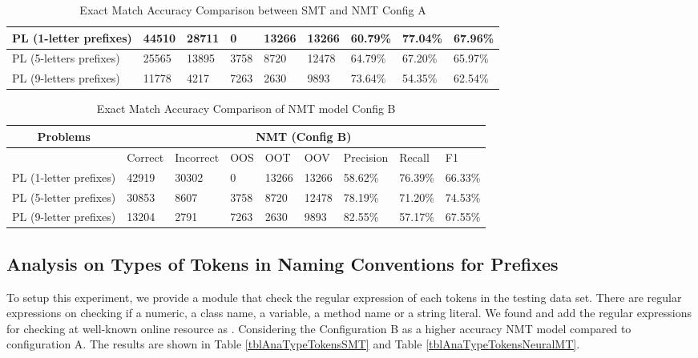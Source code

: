 \begin{table*}[]
\begin{tabular}{|l|l|l|l|l|l|l|l|l|}
PL (1-letter prefixes)  & 44510            & 28711              & 0            & 13266        & 13266        & 60.79\%            & 77.04\%         & 67.96\%     \\ \hline
PL (5-letters prefixes) & 25565            & 13895              & 3758         & 8720         & 12478        & 64.79\%            & 67.20\%         & 65.97\%     \\ \hline
PL (9-letters prefixes) & 11778            & 4217               & 7263         & 2630         & 9893         & 73.64\%            & 54.35\%         & 62.54\%     \\ \hline
\end{tabular}
\caption{Exact Match Accuracy Comparison between SMT and NMT Config A}
\label{tblExactMatchAccuracySMTAndNMT}
\end{table*}


\begin{table*}[]
\small
\begin{tabular}{|l|l|l|l|l|l|l|l|l|}
\hline
\multicolumn{1}{|c|}{\textbf{Problems}}             & \multicolumn{8}{c|}{\textbf{NMT (Config B)}}                               \\ \hline
                                                    & Correct & Incorrect & OOS  & OOT   & OOV   & Precision & Recall  & F1      \\ \hline
PL (1-letter prefixes)  & 42919   & 30302     & 0    & 13266 & 13266 & 58.62\%   & 76.39\% & 66.33\% \\ \hline
PL (5-letter prefixes) & 30853   & 8607      & 3758 & 8720  & 12478 & 78.19\%   & 71.20\% & 74.53\% \\ \hline
PL (9-letter prefixes) & 13204   & 2791      & 7263 & 2630  & 9893  & 82.55\%   & 57.17\% & 67.55\% \\ \hline
\end{tabular}
\caption{Exact Match Accuracy Comparison of NMT model Config B}
\label{tblExactMatchAccuracyNMTConfigB}
\end{table*}

\subsection{Analysis on Types of Tokens in Naming Conventions for Prefixes}
To setup this experiment, we provide a module that check the regular expression of each tokens in the testing data set. There are regular expressions on checking if a numeric, a class name, a variable, a method name or a string literal. We found and add the regular expressions for checking at well-known online resource as \cite{048,049}. Considering the Configuration B as a higher accuracy NMT model compared to configuration A. The results are shown in Table \ref{tblAnaTypeTokensSMT} and Table \ref{tblAnaTypeTokensNeuralMT}.

